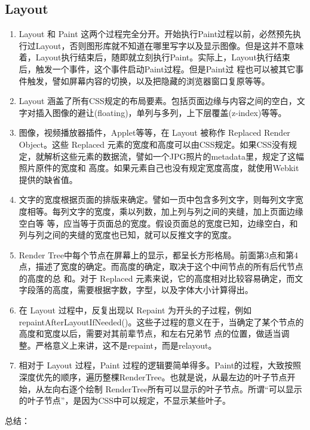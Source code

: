 \subsection{Layout}
\begin{enumerate}
	\item  Layout 和 Paint 这两个过程完全分开。开始执行Paint过程以前，必然预先执行过Layout，否则图形库就不知道在哪里写字以及显示图像。但是这并不意味 着，Layout执行结束后，随即就立刻执行Paint。实际上，Layout执行结束后，触发一个事件，这个事件启动Paint过程。但是Paint过 程也可以被其它事件触发，譬如屏幕内容的切换，以及把隐藏的浏览器窗口复原等等。
	\item Layout 涵盖了所有CSS规定的布局要素。包括页面边缘与内容之间的空白，文字对插入图像的避让(floating)，单列与多列，上下层覆盖(z-index)等等。
	\item 图像，视频播放器插件，Applet等等，在 Layout 被称作 Replaced Render Object。这些 Replaced 元素的宽度和高度可以由CSS规定。如果CSS没有规定，就解析这些元素的数据流，譬如一个JPG照片的metadata里，规定了这幅照片原件的宽度和 高度。如果元素自己也没有规定宽度高度，就使用Webkit提供的缺省值。
	\item 文字的宽度根据页面的排版来确定。譬如一页中包含多列文字，则每列文字宽度相等。每列文字的宽度，乘以列数，加上列与列之间的夹缝，加上页面边缘空白等 等，应当等于页面总的宽度。假设页面总的宽度已知，边缘空白，和列与列之间的夹缝的宽度也已知，就可以反推文字的宽度。
	\item Render Tree中每个节点在屏幕上的显示，都呈长方形格局。前面第3点和第4点，描述了宽度的确定。而高度的确定，取决于这个中间节点的所有后代节点的高度的总 和。对于 Replaced 元素来说，它的高度相对比较容易确定，而文字段落的高度，需要根据字数，字型，以及字体大小计算得出。
	\item 在 Layout 过程中，反复出现以 Repaint 为开头的子过程，例如 repaintAfterLayoutIfNeeded()。这些子过程的意义在于，当确定了某个节点的高度和宽度以后，需要对其前辈节点，和左右兄弟节 点的位置，做适当调整。严格意义上来讲，这不是repaint，而是relayout。
	\item 相对于 Layout 过程，Paint 过程的逻辑要简单得多。Paint的过程，大致按照深度优先的顺序，遍历整棵RenderTree。也就是说，从最左边的叶子节点开始，从左向右逐个绘制 RenderTree所有可以显示的叶子节点。所谓“可以显示的叶子节点”，是因为CSS中可以规定，不显示某些叶子。
\end{enumerate}
总结：
